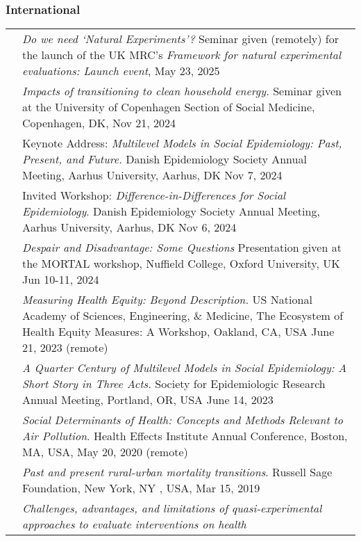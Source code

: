 \documentclass[
  letterpaper,
  DIV=11,
  numbers=noendperiod]{scrartcl}
\begin{document}
\subsubsection{International}\label{international-1}

\begin{longtable}[]{@{}
  >{\raggedright\arraybackslash}p{}
  >{\raggedright\arraybackslash}p{}@{}}
\toprule\noalign{}
\endhead
\bottomrule\noalign{}
\endlastfoot
2025 & \emph{Do we need `Natural Experiments'?} Seminar given (remotely)
for the launch of the UK MRC's \emph{Framework for natural experimental
evaluations: Launch event}, May 23, 2025 \\
2024 & \emph{Impacts of transitioning to clean household energy.}
Seminar given at the University of Copenhagen Section of Social
Medicine, Copenhagen, DK, Nov 21, 2024 \\
2024 & Keynote Address: \emph{Multilevel Models in Social Epidemiology:
Past, Present, and Future.} Danish Epidemiology Society Annual Meeting,
Aarhus University, Aarhus, DK Nov 7, 2024 \\
2024 & Invited Workshop: \emph{Difference-in-Differences for Social
Epidemiology}. Danish Epidemiology Society Annual Meeting, Aarhus
University, Aarhus, DK Nov 6, 2024 \\
2024 & \emph{Despair and Disadvantage: Some Questions} Presentation
given at the MORTAL workshop, Nuffield College, Oxford University, UK
Jun 10-11, 2024 \\
2023 & \emph{Measuring Health Equity: Beyond Description.} US National
Academy of Sciences, Engineering, \& Medicine, The Ecosystem of Health
Equity Measures: A Workshop, Oakland, CA, USA June 21, 2023 (remote) \\
2023 & \emph{A Quarter Century of Multilevel Models in Social
Epidemiology: A Short Story in Three Acts.} Society for Epidemiologic
Research Annual Meeting, Portland, OR, USA June 14, 2023 \\
2020 & \emph{Social Determinants of Health: Concepts and Methods
Relevant to Air Pollution}. Health Effects Institute Annual Conference,
Boston, MA, USA, May 20, 2020 (remote) \\
2019 & \emph{Past and present rural-urban mortality transitions}.
Russell Sage Foundation, New York, NY , USA, Mar 15, 2019 \\
2018 & \emph{Challenges, advantages, and limitations of
quasi-experimental approaches to evaluate interventions on health
}
\end{longtable}
\end{document}
